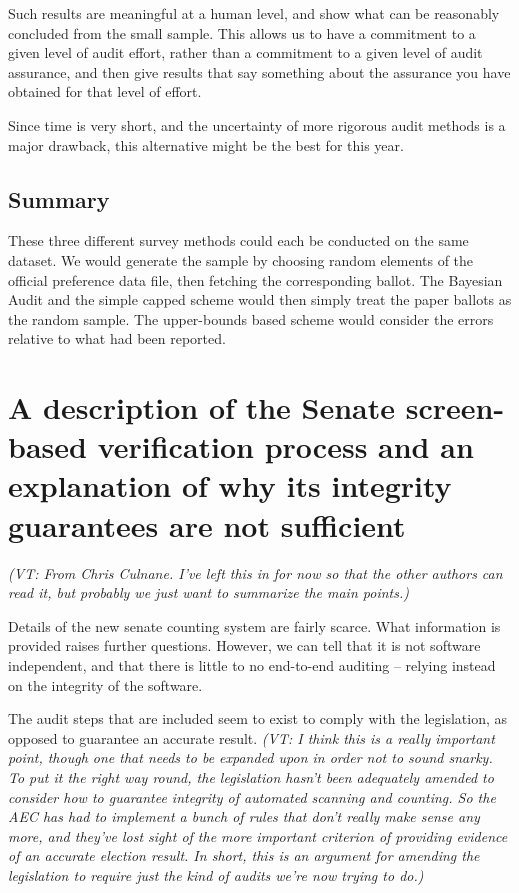 \documentclass[10pt,a4paper]{article}
\newcommand{\VTNote}[1]{{\it(VT: #1)}}
\begin{document}
Such results are meaningful at a human level, and show
what can be reasonably concluded from the small sample.
This allows us to have a commitment to a given
level of audit effort, rather than a commitment to a given level
of audit assurance, and then give results that say something about
the assurance you have obtained for that level of effort.

Since time is very short, and the uncertainty of more rigorous audit methods is a major drawback, this alternative might be the best for this year.

\subsection{Summary}
These three different survey methods could each be conducted on the same dataset.  We would generate the sample by choosing random elements of the official preference data file, then fetching the corresponding ballot.  The Bayesian Audit and the simple capped scheme would then simply treat the paper ballots as the random sample.  The upper-bounds based scheme would consider the errors relative to what had been reported.

\section{A description of the Senate screen-based verification process and an explanation of why its integrity guarantees are not sufficient}
\VTNote{From Chris Culnane.  I've left this in for now so that the other authors can read it, but probably we just want to summarize the main points.}

Details of the new senate counting system are fairly scarce. What information is provided raises further questions. However, we can tell that it is not software independent, and that there is little to no end-to-end auditing – relying instead on the integrity of the software. 

The audit steps that are included seem to exist to comply with the legislation, as opposed to guarantee an accurate result.  \VTNote{I think this is a really important point, though one that needs to be expanded upon in order not to sound snarky.  To put it the right way round, the legislation hasn't been adequately amended to consider how to guarantee integrity of automated scanning and counting.  So the AEC has had to implement a bunch of rules that don't really make sense any more, and they've lost sight of the more important criterion of providing evidence of an accurate election result.  In short, this is an argument for amending the legislation to require just the kind of audits we're now trying to do.}
\end{document}
